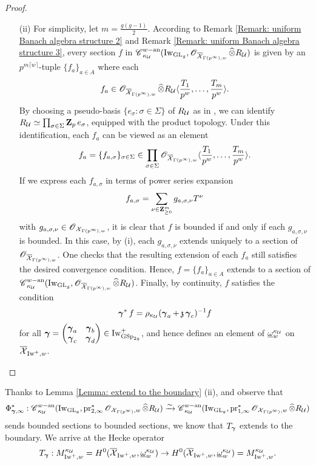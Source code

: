\begin{proof}
\begin{enumerate}
\item[(ii)] For simplicity, let $m=\frac{g(g-1)}{2}$. According to Remark \ref{Remark: uniform Banach algebra structure 2} and Remark \ref{Remark: uniform Banach algebra structure 3}, every section $f$ in $\scrC^{w-\an}_{\kappa_{\calU}}(\Iw_{\GL_g}, \scrO_{\overline{\calX}_{\Gamma(p^{\infty}),w}}\widehat{\otimes}R_{\calU})$ is given by an $p^{m\lceil w\rceil}$-tuple $\{f_a\}_{a\in A}$ where each $$f_a\in \scrO_{\overline{\calX}_{\Gamma(p^{\infty}),w}}\widehat{\otimes}R_{\calU}\langle \frac{T_1}{p^w}, \ldots, \frac{T_m}{p^w}\rangle.$$ By choosing a pseudo-basis $\{e_{\sigma}:\sigma\in \Sigma\}$ of $R_{\calU}$ as in \cite[Proposition 6.2]{CHJ-2017}, we can identify $R_{\calU}\simeq \prod_{\sigma\in \Sigma} \Z_p e_{\sigma}$, equipped with the product topology. Under this identification, each $f_a$ can be viewed as an element $$f_a=\{f_{a,\sigma}\}_{\sigma\in \Sigma}\in\prod_{\sigma\in \Sigma} \scrO_{\overline{\calX}_{\Gamma(p^{\infty}),w}}\langle \frac{T_1}{p^w}, \ldots, \frac{T_m}{p^w}\rangle.$$ If we express each $f_{a,\sigma}$ in terms of power series expansion $$f_{a,\sigma}=\sum_{\nu\in \Z_{\geq 0}^m} g_{a,\sigma,\nu} T^{\nu}$$
with $g_{a,\sigma,\nu}\in \scrO_{\calX_{\Gamma(p^{\infty}), w}}$, it is clear that $f$ is bounded if and only if each $g_{a,\sigma,\nu}$ is bounded. In this case, by (i), each $g_{a,\sigma,\nu}$ extends uniquely to a section of $\scrO_{\overline{\calX}_{\Gamma(p^{\infty}), w}}$. One checks that the resulting extension of each $f_a$ still satisfies the desired convergence condition. Hence, $f=\{f_a\}_{a\in A}$ extends to a section of $\scrC^{w-\an}_{\kappa_{\calU}}(\Iw_{\GL_g}, \scrO_{\overline{\calX}_{\Gamma(p^{\infty}),w}}\widehat{\otimes}R_{\calU})$. Finally, by continuity, $f$ satisfies the condition 
$$\bfgamma^*f=\rho_{\kappa_{\calU}}(\bfgamma_a+\frakz\bfgamma_c)^{-1} f$$ for all $\bfgamma=\begin{pmatrix}\bfgamma_a & \bfgamma_b\\ \bfgamma_c & \bfgamma_d\end{pmatrix}\in \Iw_{\GSp_{2g}}^+$, and hence defines an element of $\underline{\omega}^{\kappa_{\calU}}_w$ on $\overline{\calX}_{\Iw^+,w}$. 
\end{enumerate}
\end{proof}

Thanks to Lemma \ref{Lemma: extend to the boundary} (ii), and observe that 
$$\Phi^*_{\bfgamma, \infty}:\scrC^{w-\an}_{\kappa_{\calU}}(\Iw_{\GL_g}, \pr_{2,\infty}^*\scrO_{\calX_{\Gamma(p^{\infty})}, w}\widehat{\otimes}R_{\calU})\xrightarrow[]{\sim}\scrC^{w-\an}_{\kappa_{\calU}}(\Iw_{\GL_g}, \pr_{1,\infty}^*\scrO_{\calX_{\Gamma(p^{\infty})}, w}\widehat{\otimes}R_{\calU})$$
sends bounded sections to bounded sections, we know that $T_{\bfgamma}$ extends to the boundary. We arrive at the Hecke operator $$T_{\bfgamma}: M_{\Iw^+, w}^{\kappa_{\calU}}=H^0(\overline{\calX}_{\Iw^+,w}, \underline{\omega}^{\kappa_{\calU}}_w)\rightarrow H^0(\overline{\calX}_{\Iw^+,w}, \underline{\omega}^{\kappa_{\calU}}_w)= M_{\Iw^+, w}^{\kappa_{\calU}}.$$


